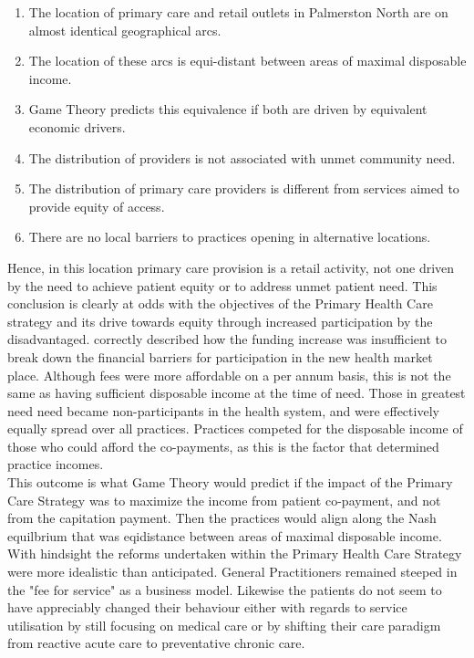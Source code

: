 \documentclass[11pt,a4paper]{article}
\begin{document}
\begin{enumerate}
\item The location of primary care and retail outlets in Palmerston North are on almost identical geographical arcs.
\item The location of these arcs is equi-distant between areas of maximal disposable income.
\item Game Theory predicts this equivalence if both are driven by equivalent economic drivers.
\item The distribution of providers is not associated with unmet community need.
\item The distribution of primary care providers is different from services aimed to provide equity of access.
\item There are no local barriers to practices opening in alternative locations.
\end{enumerate}

Hence, in this location primary care provision is a retail activity, not one driven by the need to achieve patient equity or to address unmet patient need. This conclusion is clearly at odds with the objectives of the Primary Health Care strategy and its drive towards equity through increased participation by the disadvantaged. \citet{cumming2008reforming} correctly described how the funding increase was insufficient to break down the financial barriers for participation in the new health market place. Although fees were more affordable on a per annum basis, this is not the same as having sufficient disposable income at the time of need. Those in greatest need need became non-participants in the health system, and were effectively equally spread over all practices. Practices competed for the disposable income of those who could afford the co-payments, as this is the factor that determined practice incomes.\\

This outcome is what Game Theory would predict if the impact of the Primary Care Strategy was to maximize the income from patient co-payment, and not from the capitation payment. Then the practices would align along the Nash equilbrium that was eqidistance between areas of maximal disposable income. With hindsight the reforms undertaken within the Primary Health Care Strategy were more idealistic than anticipated. General Practitioners remained steeped in the "fee for service" as a business model. Likewise the patients do not seem to have appreciably changed their behaviour either with regards to service utilisation by still focusing on medical care or by shifting their care paradigm from reactive acute care to preventative chronic care. \\
\end{document}

